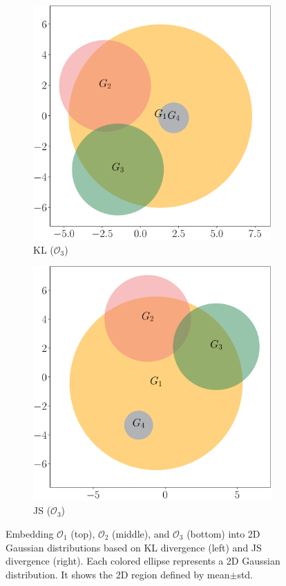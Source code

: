 \documentclass{article}
\begin{document}
\begin{figure}[t]
\begin{subfigure}[b]{.48\textwidth}
\includegraphics[width=\textwidth]{kl3}
\caption{KL ($\mathcal{O}_3$)}
\end{subfigure}
\begin{subfigure}[b]{.48\textwidth}
\includegraphics[width=\textwidth]{js3}
\caption{JS ($\mathcal{O}_3$)}
\end{subfigure}

\caption{Embedding $\mathcal{O}_1$ (top), $\mathcal{O}_2$ (middle),
and $\mathcal{O}_3$ (bottom) into 2D Gaussian distributions based on
KL divergence (left) and JS divergence (right).
Each colored ellipse represents a 2D Gaussian distribution.
It shows the 2D region defined by mean$\pm$std.}\label{fig:toy}
\end{figure}
\end{document}
